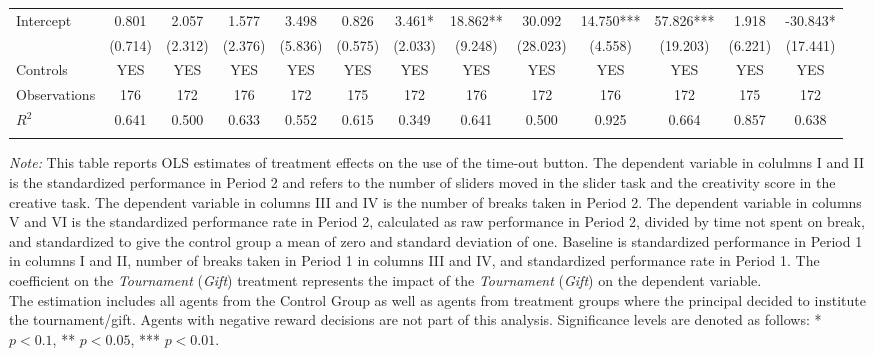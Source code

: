 \begin{landscape}
\begin{table}[h]
\begin{center}
{\begin{tabular}{lcccccccccccc}
Intercept           &       0.801   &       2.057   &       1.577   &       3.498   &       0.826   &       3.461*  &      18.862** &      30.092   &      14.750***&      57.826***&       1.918   &     -30.843*  \\
                    &     (0.714)   &     (2.312)   &     (2.376)   &     (5.836)   &     (0.575)   &     (2.033)   &     (9.248)   &    (28.023)   &     (4.558)   &    (19.203)   &     (6.221)   &    (17.441)   \\
\hline
 Controls & YES & YES & YES & YES & YES & YES & YES & YES & YES & YES & YES & YES \\
\hline
Observations        &         176   &         172   &         176   &         172   &         175   &         172   &         176   &         172   &         176   &         172   &         175   &         172   \\
$R^2$               &       0.641   &       0.500   &       0.633   &       0.552   &       0.615   &       0.349   &       0.641   &       0.500   &       0.925   &       0.664   &       0.857   &       0.638   \\
\hline\hline\noalign{\medskip}
\end{tabular}}
\begin{minipage}{1.2\textwidth}
\footnotesize {\it Note:} This table reports OLS estimates of treatment effects on the use of the time-out button. 
The dependent variable in colulmns I and II is the standardized performance in Period 2 and refers to the number of sliders moved in the slider task and the creativity score in the creative task. 
The dependent variable in columns III and IV is the number of breaks taken in Period 2.
The dependent variable in columns V and VI is the standardized performance rate in Period 2, calculated as raw performance in Period 2, divided by time not spent on break, and standardized to give the control group a mean of zero and standard deviation of one. 
Baseline is standardized performance in Period 1 in columns I and II, number of breaks taken in Period 1 in columns III and IV, and standardized performance rate in Period 1. 
The coefficient on the \textit{Tournament} (\textit{Gift}) treatment represents the impact of the \textit{Tournament} (\textit{Gift}) on the dependent variable. \\
The estimation includes all agents from the Control Group as well as agents from treatment groups where the principal decided to institute the tournament/gift. 
Agents with negative reward decisions are not part of this analysis. 
Significance levels are denoted as follows: * $p < 0.1$, ** $p < 0.05$, *** $p < 0.01$. 
\end{minipage}
\end{center}
\end{table}
\end{landscape}
